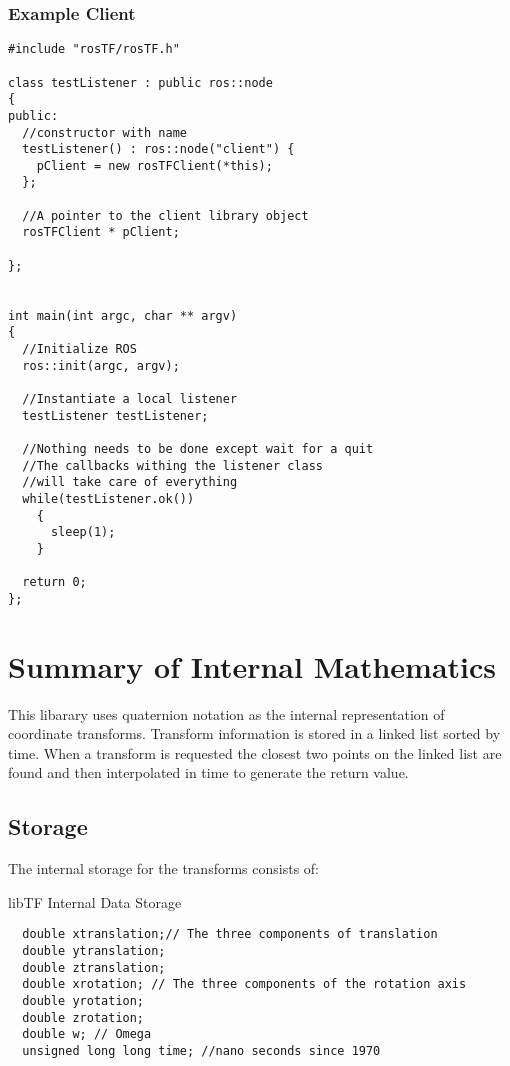 \documentclass[12pt]{article}
\begin{document}
\subsubsection{Example Client}
\begin{verbatim}
#include "rosTF/rosTF.h"

class testListener : public ros::node
{
public:
  //constructor with name
  testListener() : ros::node("client") {
    pClient = new rosTFClient(*this);
  };

  //A pointer to the client library object  
  rosTFClient * pClient;

};


int main(int argc, char ** argv)
{
  //Initialize ROS
  ros::init(argc, argv);

  //Instantiate a local listener
  testListener testListener;
  
  //Nothing needs to be done except wait for a quit
  //The callbacks withing the listener class 
  //will take care of everything
  while(testListener.ok())
    {
      sleep(1);
    }

  return 0;
};
\end{verbatim}

\section{Summary of Internal Mathematics}
This libarary uses quaternion notation as the internal representation
of coordinate transforms.  Transform information is stored in a linked 
list sorted by time.  When a transform is requested the closest two points 
on the linked list are found and then interpolated in time to generate the 
return value.  

\subsection{Storage}
The internal storage for the transforms consists of:
\begin{struct}[H]
\caption{libTF Internal Data Storage}
\begin{verbatim}
  double xtranslation;// The three components of translation
  double ytranslation;
  double ztranslation;
  double xrotation; // The three components of the rotation axis
  double yrotation;
  double zrotation;
  double w; // Omega
  unsigned long long time; //nano seconds since 1970
\end{verbatim}
\end{struct}
\end{document}
